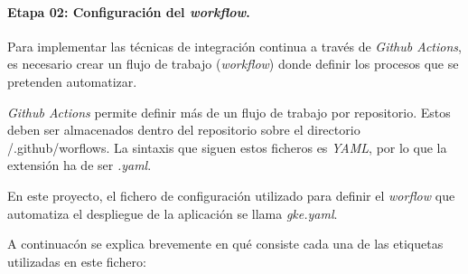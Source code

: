 
\paragraph{Etapa 02: Configuración del \emph{workflow}.}

Para implementar las técnicas de integración continua a través de
\emph{Github Actions}, es necesario crear un flujo de trabajo
(\emph{workflow}) donde definir los procesos que se pretenden
automatizar.

\emph{Github Actions} permite definir más de un flujo de trabajo por
repositorio. Estos deben ser almacenados dentro del repositorio sobre el
directorio {/.github/worflows}. La sintaxis que siguen estos ficheros es
\emph{YAML}, por lo que la extensión ha de ser \emph{.yaml}.

En este proyecto, el fichero de configuración utilizado para definir el
\emph{worflow} que automatiza el despliegue de la aplicación se llama
\emph{gke.yaml}.

A continuacón se explica brevemente en qué consiste cada una de las
etiquetas utilizadas en este fichero:

